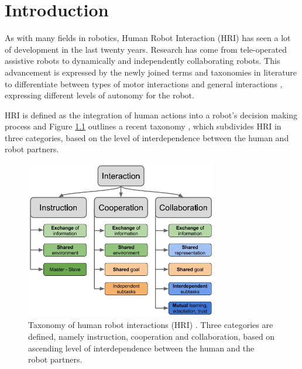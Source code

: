 \chapter{Introduction}
\label{sec:introduction}

As with many fields in robotics, Human Robot Interaction (HRI) has seen a lot of development in the last twenty years. Research has come from tele-operated assistive robots to dynamically and independently collaborating robots. This advancement is expressed by the newly joined terms and taxonomies in literature to differentiate between types of motor interactions \citep{jarrasse2012framework} and general interactions \citep{butepage2017human}, expressing different levels of autonomy for the robot.

HRI is defined as the integration of human actions into a robot's decision making process and Figure \ref{pics:butepage2017} outlines a recent taxonomy \citep{butepage2017human}, which subdivides HRI in three categories, based on the level of interdependence between the human and robot partners.

\begin{figure}[h]
   \centering
   \includegraphics[width=0.75\textwidth]{images/HRC_roles.jpg}
   \caption{Taxonomy of human robot interactions (HRI) \citep{butepage2017human}. Three categories are defined, namely instruction, cooperation and collaboration, based on ascending level of interdependence between the human and the robot partners.}
   \label{pics:butepage2017}
\end{figure}

